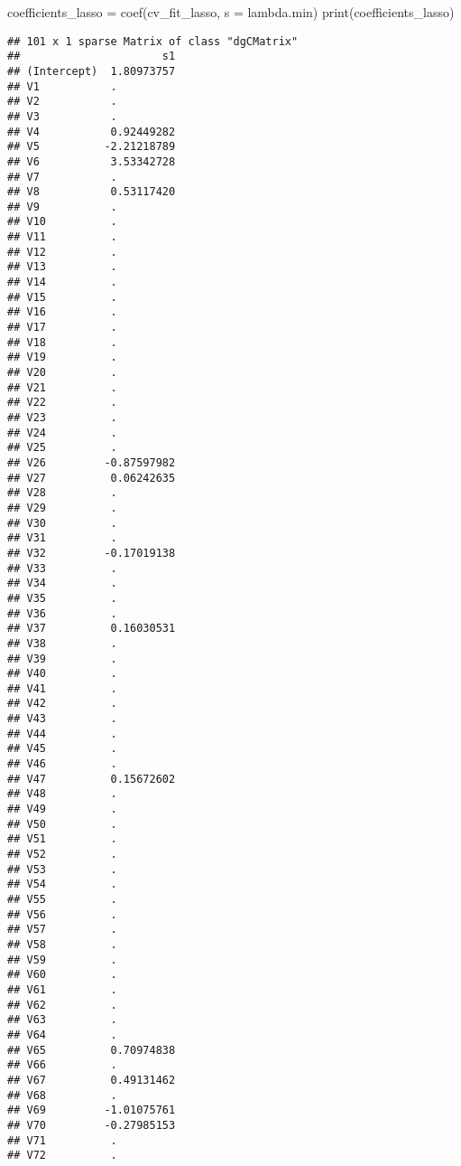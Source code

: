 \documentclass[
]{book}
\newenvironment{Shaded}{\begin{snugshade}}{\end{snugshade}}
\newcommand{\AttributeTok}[1]{\textcolor[rgb]{0.77,0.63,0.00}{#1}}
\newcommand{\FunctionTok}[1]{\textcolor[rgb]{0.00,0.00,0.00}{#1}}
\newcommand{\NormalTok}[1]{#1}
\newcommand{\OtherTok}[1]{\textcolor[rgb]{0.56,0.35,0.01}{#1}}
\newcommand{\StringTok}[1]{\textcolor[rgb]{0.31,0.60,0.02}{#1}}
\begin{document}
\begin{Shaded}
\begin{Highlighting}[]
\NormalTok{coefficients\_lasso }\OtherTok{=} \FunctionTok{coef}\NormalTok{(cv\_fit\_lasso, }\AttributeTok{s =} \StringTok{\textquotesingle{}lambda.min\textquotesingle{}}\NormalTok{)}
\FunctionTok{print}\NormalTok{(coefficients\_lasso)}
\end{Highlighting}
\end{Shaded}

\begin{verbatim}
## 101 x 1 sparse Matrix of class "dgCMatrix"
##                      s1
## (Intercept)  1.80973757
## V1           .         
## V2           .         
## V3           .         
## V4           0.92449282
## V5          -2.21218789
## V6           3.53342728
## V7           .         
## V8           0.53117420
## V9           .         
## V10          .         
## V11          .         
## V12          .         
## V13          .         
## V14          .         
## V15          .         
## V16          .         
## V17          .         
## V18          .         
## V19          .         
## V20          .         
## V21          .         
## V22          .         
## V23          .         
## V24          .         
## V25          .         
## V26         -0.87597982
## V27          0.06242635
## V28          .         
## V29          .         
## V30          .         
## V31          .         
## V32         -0.17019138
## V33          .         
## V34          .         
## V35          .         
## V36          .         
## V37          0.16030531
## V38          .         
## V39          .         
## V40          .         
## V41          .         
## V42          .         
## V43          .         
## V44          .         
## V45          .         
## V46          .         
## V47          0.15672602
## V48          .         
## V49          .         
## V50          .         
## V51          .         
## V52          .         
## V53          .         
## V54          .         
## V55          .         
## V56          .         
## V57          .         
## V58          .         
## V59          .         
## V60          .         
## V61          .         
## V62          .         
## V63          .         
## V64          .         
## V65          0.70974838
## V66          .         
## V67          0.49131462
## V68          .         
## V69         -1.01075761
## V70         -0.27985153
## V71          .         
## V72          .         

\end{verbatim}
\end{document}
